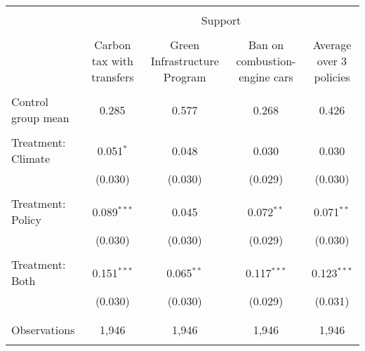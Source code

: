 
\begin{tabular}{@{\extracolsep{5pt}}lcccc} 
\\[-1.8ex]\hline 
\hline \\[-1.8ex] 
 & \multicolumn{4}{c}{Support} \\ 
\cline{2-5} 
\\[-1.8ex] & Carbon tax with transfers & Green Infrastructure Program & Ban on combustion-engine cars & Average over 3 policies \\ 
\hline \\[-1.8ex] 
 Control group mean & 0.285 & 0.577 & 0.268 & 0.426  \\ \hline \\[-1.8ex] Treatment: Climate & 0.051$^{*}$ & 0.048 & 0.030 & 0.030 \\ 
  & (0.030) & (0.030) & (0.029) & (0.030) \\ 
  & & & & \\ 
 Treatment: Policy & 0.089$^{***}$ & 0.045 & 0.072$^{**}$ & 0.071$^{**}$ \\ 
  & (0.030) & (0.030) & (0.029) & (0.030) \\ 
  & & & & \\ 
 Treatment: Both & 0.151$^{***}$ & 0.065$^{**}$ & 0.117$^{***}$ & 0.123$^{***}$ \\ 
  & (0.030) & (0.030) & (0.029) & (0.031) \\ 
  & & & & \\ 
\hline \\[-1.8ex] 

Observations & 1,946 & 1,946 & 1,946 & 1,946 \\ 
\hline 
\hline \\[-1.8ex] 
\end{tabular} 